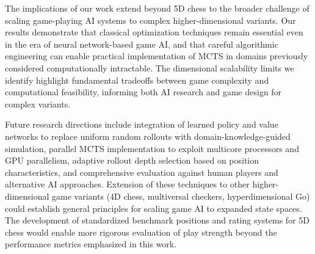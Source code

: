\documentclass{article}
\begin{document}
The implications of our work extend beyond 5D chess to the broader challenge of scaling game-playing AI systems to complex higher-dimensional variants. Our results demonstrate that classical optimization techniques remain essential even in the era of neural network-based game AI, and that careful algorithmic engineering can enable practical implementation of MCTS in domains previously considered computationally intractable. The dimensional scalability limits we identify highlight fundamental tradeoffs between game complexity and computational feasibility, informing both AI research and game design for complex variants.

Future research directions include integration of learned policy and value networks to replace uniform random rollouts with domain-knowledge-guided simulation, parallel MCTS implementation to exploit multicore processors and GPU parallelism, adaptive rollout depth selection based on position characteristics, and comprehensive evaluation against human players and alternative AI approaches. Extension of these techniques to other higher-dimensional game variants (4D chess, multiversal checkers, hyperdimensional Go) could establish general principles for scaling game AI to expanded state spaces. The development of standardized benchmark positions and rating systems for 5D chess would enable more rigorous evaluation of play strength beyond the performance metrics emphasized in this work.
\end{document}
